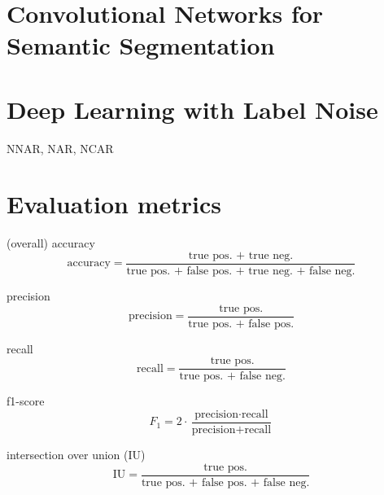 \newpage
\appendix



\section{Convolutional Networks for Semantic Segmentation}




\section{Deep Learning with Label Noise}
NNAR, NAR, NCAR




\section{Evaluation metrics}

(overall) accuracy
$$ \text{accuracy} = \frac{\text{true pos. + true neg.}}{\text{true pos. + false pos. + true neg. + false neg.}}$$

precision
$$\text{precision} = \frac{\text{true pos.}}{\text{true pos. + false pos.}}$$

recall
$$\text{recall} = \frac{\text{true pos.}}{\text{true pos. + false neg.}}$$

f1-score
$$F_1 = 2 \cdot \frac{\text{precision} \cdot \text{recall}}{\text{precision}+\text{recall}}$$

intersection over union (IU)
$$ \text{IU} = \frac{\text{true pos.}}{\text{true pos. + false pos. + false neg.}}$$


